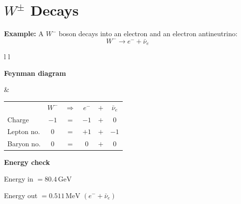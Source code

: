 \documentclass[12pt]{article}
\begin{document}
\section*{\(W^{\pm}\) Decays}

\textbf{Example:} A $W^-$ boson decays into an electron and an electron antineutrino:
\[
W^- \rightarrow e^- + \bar{\nu}_e
\]

\vspace{0.5cm}

\begin{tabular}{l l}

\begin{minipage}[t]{0.46\textwidth}
\vspace{0pt}
\textbf{Feynman diagram}

\vspace{0.6cm}

\begin{tikzpicture}
\begin{feynman}
  \vertex (W) at (0,2) {};
  \vertex [coordinate] (v) at (3,2) {};

  \vertex (e)  at (4,4) {\(e^-\)};
  \vertex (nu) at (5,3) {\(\bar{\nu}_e\)};

  \diagram*{
    (W) -- [boson, edge label=\(W^-\), momentum'={}] (v),
    (v) -- [fermion] (e),
    (v) -- [fermion] (nu),
  };
\end{feynman}
\end{tikzpicture}
\end{minipage}
&
\begin{minipage}[t]{0.50\textwidth}
\vspace{0pt}

\renewcommand{\arraystretch}{1.4}
\begin{tabular}{@{}l c c c c c@{}}
 & \(W^-\) & \(\Rightarrow\) & \(e^-\) & \(+\) & \(\bar{\nu}_e\) \\
Charge & $-1$ & $=$ & $-1$ & $+$ & $0$ \\
Lepton no. & $0$ & $=$ & $+1$ & $+$ & $-1$ \\
Baryon no. & $0$ & $=$ & $0$ & $+$ & $0$ \\
\end{tabular}

\vspace{0.6cm}

\textbf{Energy check}

Energy in $= 80.4\,\mathrm{GeV}$

Energy out $= 0.511\,\mathrm{MeV}$ $(e^- + \bar{\nu}_e)$

\end{minipage}

\end{tabular}
\end{document}
